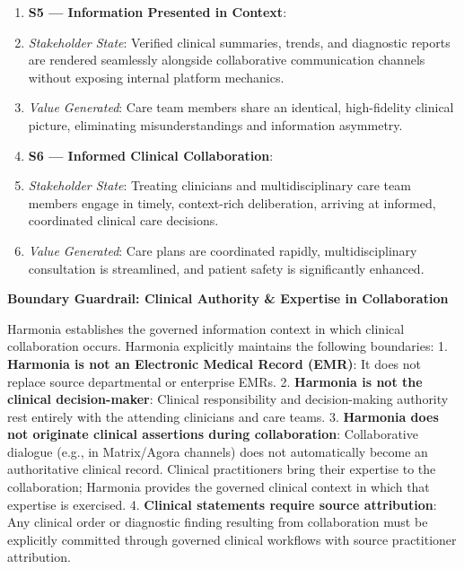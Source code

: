 \begin{enumerate}
\item \textbf{S5 — Information Presented in Context}:

\item \emph{Stakeholder State}: Verified clinical summaries, trends, and diagnostic reports are rendered seamlessly alongside collaborative communication channels without exposing internal platform mechanics.

\item \emph{Value Generated}: Care team members share an identical, high-fidelity clinical picture, eliminating misunderstandings and information asymmetry.

\item \textbf{S6 — Informed Clinical Collaboration}:

\item \emph{Stakeholder State}: Treating clinicians and multidisciplinary care team members engage in timely, context-rich deliberation, arriving at informed, coordinated clinical care decisions.

\item \emph{Value Generated}: Care plans are coordinated rapidly, multidisciplinary consultation is streamlined, and patient safety is significantly enhanced.

\end{enumerate}


\par\medskip\textbf{Boundary Guardrail: Clinical Authority \& Expertise in Collaboration}\par


Harmonia establishes the governed information context in which clinical collaboration occurs. Harmonia explicitly maintains the following boundaries:
1. \textbf{Harmonia is not an Electronic Medical Record (EMR)}: It does not replace source departmental or enterprise EMRs.
2. \textbf{Harmonia is not the clinical decision-maker}: Clinical responsibility and decision-making authority rest entirely with the attending clinicians and care teams.
3. \textbf{Harmonia does not originate clinical assertions during collaboration}: Collaborative dialogue (e.g., in Matrix/Agora channels) does not automatically become an authoritative clinical record. Clinical practitioners bring their expertise to the collaboration; Harmonia provides the governed clinical context in which that expertise is exercised.
4. \textbf{Clinical statements require source attribution}: Any clinical order or diagnostic finding resulting from collaboration must be explicitly committed through governed clinical workflows with source practitioner attribution.



